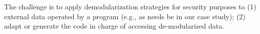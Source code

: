 



The challenge is to apply demodularization strategies for security purposes to (1) external data operated by a program (e.g., as needs be in our case study); (2) adapt or generate the code in charge of accessing de-modularized data.  





